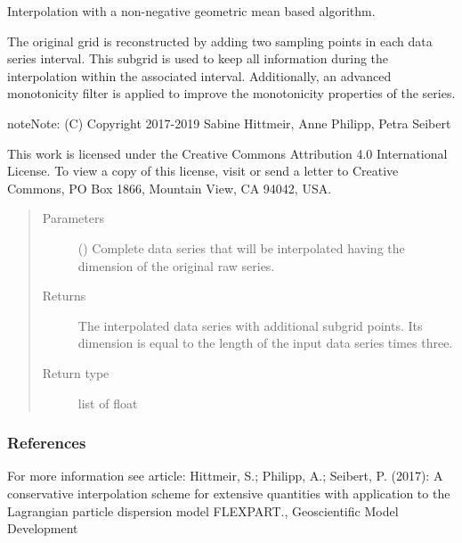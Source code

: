 \documentclass[letterpaper,10pt,english]{sphinxmanual}
\begin{document}
\begin{fulllineitems}
\label{\detokenize{api:disaggregation.IA3}}
Interpolation with a non-negative geometric mean based algorithm.

The original grid is reconstructed by adding two sampling points in each
data series interval. This subgrid is used to keep all information during
the interpolation within the associated interval. Additionally, an advanced
monotonicity filter is applied to improve the monotonicity properties of
the series.

\begin{sphinxadmonition}{note}{Note:}
(C) Copyright 2017-2019
Sabine Hittmeir, Anne Philipp, Petra Seibert

This work is licensed under the Creative Commons Attribution 4.0
International License. To view a copy of this license, visit
 or send a letter to
Creative Commons, PO Box 1866, Mountain View, CA 94042, USA.
\end{sphinxadmonition}
\begin{quote}\begin{description}
\item[{Parameters}] \leavevmode
{} () \textendash{} Complete data series that will be interpolated having
the dimension of the original raw series.

\item[{Returns}] \leavevmode
{} \textendash{} The interpolated data series with additional subgrid points.
Its dimension is equal to the length of the input data series
times three.

\item[{Return type}] \leavevmode
list of float

\end{description}\end{quote}
\subsubsection*{References}

For more information see article:
Hittmeir, S.; Philipp, A.; Seibert, P. (2017): A conservative
interpolation scheme for extensive quantities with application to the
Lagrangian particle dispersion model FLEXPART.,
Geoscientific Model Development

\end{fulllineitems}
\end{document}
